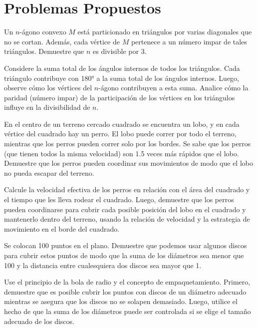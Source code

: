 \documentclass[11pt]{scrartcl}
\begin{document}

\section{Problemas Propuestos}

\begin{problem}
Un \( n \)-ágono convexo \( M \) está particionado en triángulos por varias diagonales que no se cortan. Además, cada vértice de \( M \) pertenece a un número impar de tales triángulos. Demuestre que \( n \) es divisible por 3.
    \begin{hint}
    Considere la suma total de los ángulos internos de todos los triángulos. Cada triángulo contribuye con 180° a la suma total de los ángulos internos. Luego, observe cómo los vértices del \( n \)-ágono contribuyen a esta suma. Analice cómo la paridad (número impar) de la participación de los vértices en los triángulos influye en la divisibilidad de \( n \).
    \end{hint}
\end{problem}

\begin{problem}
En el centro de un terreno cercado cuadrado se encuentra un lobo, y en cada vértice del cuadrado hay un perro. El lobo puede correr por todo el terreno, mientras que los perros pueden correr solo por los bordes. Se sabe que los perros (que tienen todos la misma velocidad) son 1.5 veces más rápidos que el lobo. Demuestre que los perros pueden coordinar sus movimientos de modo que el lobo no pueda escapar del terreno.
    \begin{hint}
    Calcule la velocidad efectiva de los perros en relación con el área del cuadrado y el tiempo que les lleva rodear el cuadrado. Luego, demuestre que los perros pueden coordinarse para cubrir cada posible posición del lobo en el cuadrado y mantenerlo dentro del terreno, usando la relación de velocidad y la estrategia de movimiento en el borde del cuadrado.
    \end{hint}
\end{problem}

\begin{problem}
Se colocan 100 puntos en el plano. Demuestre que podemos usar algunos discos para cubrir estos puntos de modo que la suma de los diámetros sea menor que 100 y la distancia entre cualesquiera dos discos sea mayor que 1.
    \begin{hint}
    Use el principio de la bola de radio y el concepto de empaquetamiento. Primero, demuestre que es posible cubrir los puntos con discos de un diámetro adecuado mientras se asegura que los discos no se solapen demasiado. Luego, utilice el hecho de que la suma de los diámetros puede ser controlada si se elige el tamaño adecuado de los discos.
    \end{hint}
\end{problem}
\end{document}
